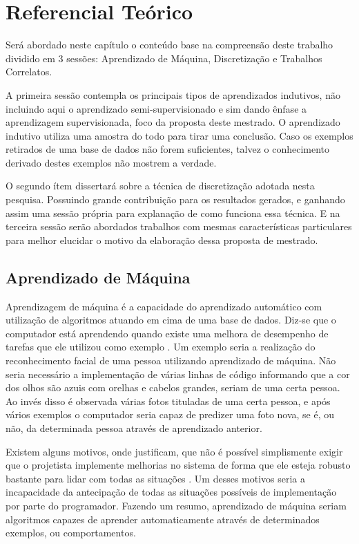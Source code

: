 \chapter{Referencial Teórico}\label{cap:refTeor}

Será abordado neste capítulo o conteúdo base na compreensão deste trabalho dividido em 3 sessões: Aprendizado de Máquina, Discretização e Trabalhos Correlatos. 

A primeira sessão contempla os principais tipos de aprendizados indutivos, não incluindo aqui o aprendizado semi-supervisionado e sim dando ênfase a aprendizagem supervisionada, foco da proposta deste mestrado. O aprendizado indutivo utiliza uma amostra do todo para tirar uma conclusão. Caso os exemplos retirados de uma base de dados não forem suficientes, talvez o conhecimento derivado destes exemplos não mostrem a verdade. 

O segundo ítem dissertará sobre a técnica de discretização adotada nesta pesquisa. Possuindo grande contribuição para os resultados gerados, e ganhando assim uma sessão própria para explanação de como funciona essa técnica. E na terceira sessão serão abordados trabalhos com mesmas características particulares para melhor elucidar o motivo da elaboração dessa proposta de mestrado.



\section{Aprendizado de Máquina}\label{cap:refTeor:sec:aprendMaq}

Aprendizagem de máquina é a capacidade do aprendizado automático com utilização de algoritmos atuando em cima de uma base de dados.  Diz-se que o computador está aprendendo quando existe uma melhora de desempenho de tarefas que ele utilizou como exemplo \cite{Mitchell1997}. Um exemplo seria a realização do reconhecimento facial de uma pessoa utilizando aprendizado de máquina. Não seria necessário a implementação de várias linhas de código informando que a cor dos olhos são azuis com orelhas e cabelos grandes, seriam de uma certa pessoa. Ao invés disso é observada várias fotos tituladas de uma certa pessoa, e após vários exemplos o computador seria capaz de predizer uma foto nova, se é, ou não, da determinada pessoa através de aprendizado anterior.

Existem alguns motivos, onde justificam, que não é possível simplismente exigir que o projetista implemente melhorias no sistema de forma que ele esteja robusto bastante para lidar com todas as situações \cite{RusselStuart.Norvig2013}. Um  desses motivos seria a incapacidade da antecipação de  todas as situações possíveis de implementação por parte do programador. Fazendo um resumo, aprendizado de máquina seriam algoritmos capazes de aprender automaticamente através de  determinados exemplos, ou comportamentos. 

